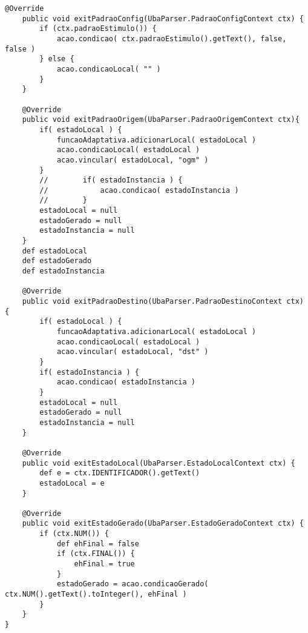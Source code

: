 \begin{lstlisting}[style=java]
    @Override
    public void exitPadraoConfig(UbaParser.PadraoConfigContext ctx) {
        if (ctx.padraoEstimulo()) {
            acao.condicao( ctx.padraoEstimulo().getText(), false, false )
        } else {
            acao.condicaoLocal( "" )
        }
    }

    @Override
    public void exitPadraoOrigem(UbaParser.PadraoOrigemContext ctx){
        if( estadoLocal ) {
            funcaoAdaptativa.adicionarLocal( estadoLocal )
            acao.condicaoLocal( estadoLocal )
            acao.vincular( estadoLocal, "ogm" )
        }
        //        if( estadoInstancia ) {
        //            acao.condicao( estadoInstancia )
        //        }
        estadoLocal = null
        estadoGerado = null
        estadoInstancia = null
    }
    def estadoLocal
    def estadoGerado
    def estadoInstancia

    @Override
    public void exitPadraoDestino(UbaParser.PadraoDestinoContext ctx) {
        if( estadoLocal ) {
            funcaoAdaptativa.adicionarLocal( estadoLocal )
            acao.condicaoLocal( estadoLocal )
            acao.vincular( estadoLocal, "dst" )
        }
        if( estadoInstancia ) {
            acao.condicao( estadoInstancia )
        }
        estadoLocal = null
        estadoGerado = null
        estadoInstancia = null
    }

    @Override
    public void exitEstadoLocal(UbaParser.EstadoLocalContext ctx) {
        def e = ctx.IDENTIFICADOR().getText()
        estadoLocal = e
    }

    @Override
    public void exitEstadoGerado(UbaParser.EstadoGeradoContext ctx) {
        if (ctx.NUM()) {
            def ehFinal = false
            if (ctx.FINAL()) {
                ehFinal = true
            }
            estadoGerado = acao.condicaoGerado( ctx.NUM().getText().toInteger(), ehFinal )
        }
    }
}
\end{lstlisting}
